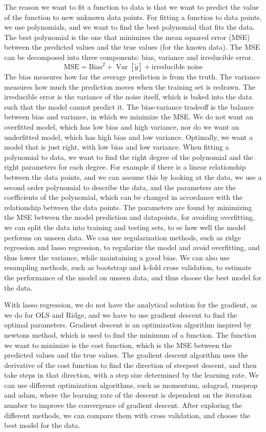 \documentclass[aps,rmp,reprint,raggedbottom,amsmath,amssymb,longbibliography]{revtex4-1}
\begin{document}
The reason we want to fit a function to data is that we want to
predict the value of the function to new unknown data points. For fitting a function to
data points, we use polynomials, and we want to find the best polynomial that fits the data.
The best polynomial is the one that minimizes the mean squared error (MSE) between the predicted values and the true values (for the known data).
The MSE can be decomposed into three components: bias, variance and irreducible error.
\[
  \mathrm{MSE} = \mathrm{Bias}^2 + \operatorname{Var}[\tilde{y}]
  + \text{irreducible noise}
\]
The bias measures how far the average prediction is from the truth.
The variance measures how much the prediction moves when the training
set is redrawn.
The irreducible error is the variance of the noise itself,
which is baked into the data such that the model cannot predict it. \cite[p.~62]{LectureNotes}
The bias-variance tradeoff is the balance between bias and variance, in which we minimize the MSE. We do not want
an overfitted model, which has low bias and high variance, nor do we want an underfitted model, which has high bias and low variance.
Optimally, we want a model that is just right, with low bias and low variance.
When fitting a polynomial to data, we want to find the right degree of the polynomial and
the right parameters for each degree. For example if there is a linear relationship between
the data points, and we can assume this by looking at the data, we use a second order polynomial
to describe the data, and the parameters are the coefficients of the polynomial, which can be
changed in accordance with the relationship between the data points.
The parameters are found by minimizing the MSE between the model prediction and datapoints,
for avoiding overfitting, we can split the data into training and testing sets, to se how well
the model performs on unseen data. We can use regularization methods, such as ridge regression
and lasso regression, to regularize the model and avoid overfitting, and thus lower the variance, while maintaining a good bias.
We can also use resampling methods, such as bootstrap and k-fold cross validation, to estimate the performance of the model on unseen data,
and thus choose the best model for the data.

With lasso regression, we do not have the analytical solution for the gradient, as we do for OLS and Ridge, and we have to use gradient descent to find the optimal parameters.
Gradient descent is an optimization algorithm inspired by newtons method, which is used to find the minimum of a function.
The function we want to minimize is the cost function, which is the MSE between the predicted values and the true values.
The gradient descent algorithm uses the derivative of the cost function to find the direction of steepest descent,
and then take steps in that direction, with a step size determined by the learning rate.
We can use different optimization algorithms, such as momentum, adagrad, rmsprop and adam,
where the learning rate of the descent is dependent on the iteration number to improve the convergence of gradient descent.
After exploring the different methods, we can compare them with cross validation, and choose the best model for the data.
\end{document}
